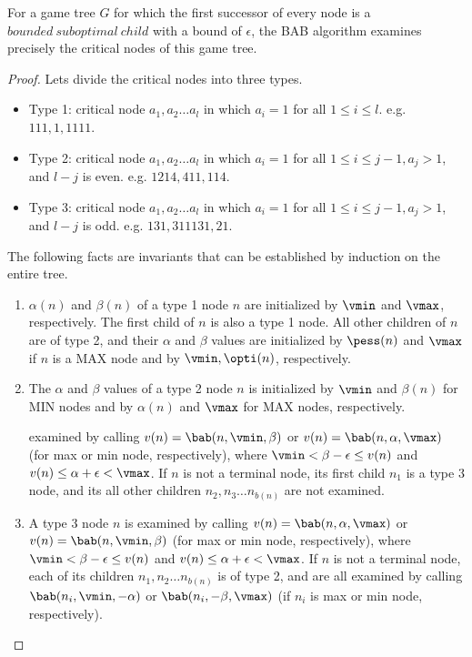 \begin{theorem}
 For a game tree $G$ for which the first successor of every node is a $\mathit{bounded~suboptimal~child}$ with a bound of $\epsilon$, the BAB algorithm examines precisely the critical nodes of this game tree.
\label{the:newbest}
\end{theorem}
\begin{proof}
Lets divide the critical nodes into three types.

\begin{itemize}
  \item Type 1: critical node $a_1, a_2 \ldots a_l$ in which $a_i=1$ for all $1 \leq i \leq l$. e.g. $111, 1, 1111$.
  
  \item Type 2: critical node $a_1, a_2 \ldots a_l$ in which $a_i=1$ for all $1 \leq i \leq j-1, a_j>1$, and $l-j$ is even. e.g. $1214, 411, 114$.
  
  \item Type 3: critical node $a_1, a_2 \ldots a_l$ in which $a_i=1$ for all $1 \leq i \leq j-1, a_j>1$, and $l-j$ is odd. e.g. $131, 311131, 21$.
\end{itemize}


The following facts are invariants that can be established by induction on the entire tree.

\begin{enumerate}

  \item $\alpha(n)$ and $\beta(n)$ of a type 1 node $n$ are initialized by $\vmin$ and $\vmax$, respectively. The first child of $n$ is also a type 1 node. All other children of $n$ are of type 2, and their $\alpha$ and $\beta$ values are initialized by $\pess(n)$ and $\vmax$ if $n$ is a MAX node and by $\vmin, \opti(n)$, respectively. 
  
  \item The $\alpha$ and $\beta$ values of a type 2 node $n$ is initialized by $\vmin$ and $\beta(n)$ for MIN nodes and by $\alpha(n)$ and $\vmax$ for MAX nodes, respectively. 
  
  examined by calling $v(n) = \bab(n, \vmin, \beta)$ or $v(n) = \bab(n,\alpha, \vmax)$ (for max or min node, respectively), where 
$\vmin < \beta - \epsilon  \leq  v(n)$ and $v(n)  \leq  \alpha + \epsilon < \vmax$. If $n$ is not a terminal node, its  first child $n_1$ is a type 3 node, and its all other children $n_2, n_3 \ldots n_{b(n)}$ are not examined.
 
  \item A type 3 node $n$ is examined by calling $v(n) = \bab(n,\alpha, \vmax)$ or $v(n) = \bab(n, \vmin, \beta)$ (for max or min node, respectively), where
$\vmin < \beta - \epsilon  \leq  v(n)$ and $v(n)  \leq  \alpha + \epsilon < \vmax$. If $n$ is not a terminal node, each of its children $n_1, n_2 \ldots n_{b(n)}$ 
is of type 2, and are all examined by calling $\bab(n_i, \vmin, -\alpha)$ or $\bab(n_i, -\beta, \vmax)$ (if $n_i$ is max or min node, respectively).

\end{enumerate}

\end{proof}
